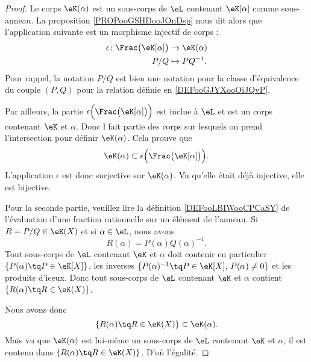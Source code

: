 \begin{proof}
    Le corps \( \eK(\alpha)\) est un sous-corps de \( \eL\) contenant \( \eK[\alpha]\) comme sous-anneau. La proposition \ref{PROPooGSHDooJOnDsp} nous dit alors que l'application suivante est un morphisme injectif de corps :
    \begin{equation}
        \begin{aligned}
            \epsilon\colon \Frac\big( \eK[\alpha] \big)&\to \eK(\alpha) \\
            P/Q&\mapsto PQ^{-1}. 
        \end{aligned}
    \end{equation}
    Pour rappel, la notation \( P/Q\) est bien une notation pour la classe d'équivalence du couple \( (P,Q)\) pour la relation définie en \ref{DEFooGJYXooOiJQvP}.

    Par ailleurs, la partie $\epsilon\Big( \Frac\big( \eK[\alpha] \big) \Big)$ est inclue à \( \eL\) et est un corps contenant \( \eK\) et \( \alpha\). Donc l fait partie des corps sur lesquels on prend l'intersection pour définir \( \eK(\alpha)\). Cela prouve que
    \begin{equation}
        \eK(\alpha)\subset  \epsilon\Big( \Frac\big( \eK[\alpha] \big) \Big).
    \end{equation}
    L'application \( \epsilon\) est donc surjective sur \( \eK(\alpha)\). Vu qu'elle était déjà injective, elle est bijective.

    Pour la seconde partie, veuillez lire la définition \ref{DEFooLBIWooCPCaSY} de l'évaluation d'une fraction rationnelle sur un élément de l'anneau. Si \( R=P/Q\in \eK(X)\) et si \( \alpha\in \eL\), nous avons
    \begin{equation}
        R(\alpha)=P(\alpha)Q(\alpha)^{-1}.
    \end{equation}
    Tout sous-corps de \( \eL\) contenant \( \eK\) et \( \alpha\) doit contenir en particulier \( \{ P(\alpha)\tq P\in \eK[X] \} \), les inverses \( \{ P(\alpha)^{-1}\tq P\in \eK[X],\,P(\alpha)\neq 0 \}\) et les produits d'iceux. Donc tout sous-corps de \( \eL\) contenant \( \eK\) et \( \alpha\) contient \( \{ R(\alpha)\tq R\in \eK(X) \}\).

    Nous avons donc
    \begin{equation}
        \{ R(\alpha)\tq R\in \eK(X) \}\subset \eK(\alpha).
    \end{equation}
    Mais vu que \( \eK(\alpha)\) est lui-même un sous-corps de \( \eL\) contenant \( \eK\) et \( \alpha\), il est contenu dans \( \{ R(\alpha)\tq R\in \eK(X) \}\). D'où l'égalité.
\end{proof}

